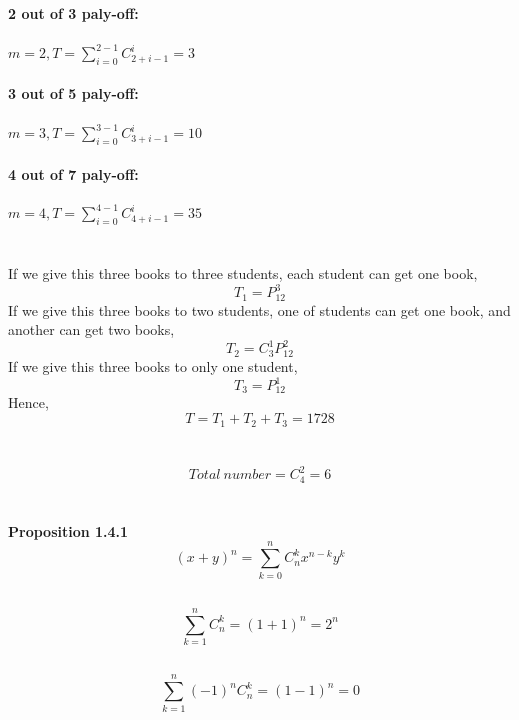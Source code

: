 \documentclass{article}
\begin{document}
        \subsection{}
                \textbf{2 out of 3 paly-off:}
                \\
                \\
                $m=2, T=\sum _{i=0} ^{2-1} C_{2+i-1} ^{i}=3$
                \\
                \\
                \textbf{3 out of 5 paly-off:}
                \\
                \\
                $m=3, T=\sum _{i=0} ^{3-1} C_{3+i-1} ^{i}=10$
                \\
                \\
                \textbf{4 out of 7 paly-off:}
                \\
                \\
                $m=4, T=\sum _{i=0} ^{4-1} C_{4+i-1} ^{i}=35$
    \section{}
        If we give this three books to three students, each student can get one book,
        $$T_1=P_{12}^3$$
        If we give this three books to two students, one of students can get one book, and another can get two books,
        $$T_2=C_3^1 P_{12}^{2}$$
        If we give this three books to only one student,
        $$T_3=P_{12}^1$$
        Hence,
        $$T=T_1+T_2+T_3=1728$$
    
    \section{}
        $$Total \ number =C_4 ^2 =6$$
    
    \section{}
        \textbf{Proposition 1.4.1}
        $$(x+y)^n=\sum _{k=0} ^n C_n^k x^{n-k}y^k$$

        \subsection{}
                $$\sum _{k=1}^{n}C_n ^k=(1+1)^n=2^n$$
        \subsection{}
                $$\sum _{k=1}^{n}(-1)^nC_n ^k=(1-1)^n=0$$
\end{document}
